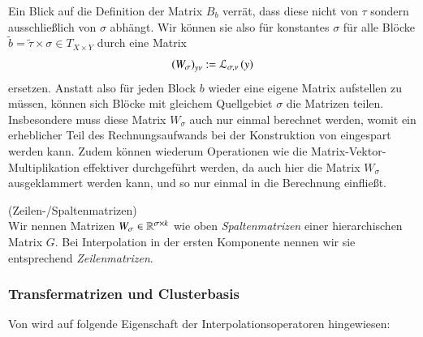     Ein Blick auf die Definition der Matrix $B_b$ verrät, dass diese nicht von $\tau$ sondern ausschließlich von $\sigma$ abhängt. Wir können sie also für konstantes $\sigma$ für alle Blöcke 
    $\tilde b = \tilde \tau \times \sigma \in T_{X \times Y}$ durch eine Matrix
    \begin{equation*}
      \left(W_\sigma\right)_{y\nu} := \mathcal{L}_{\sigma, \nu}\left(y\right)
    \end{equation*} 
    ersetzen. Anstatt also für jeden Block $b$ wieder eine eigene Matrix aufstellen zu müssen, können sich Blöcke mit gleichem Quellgebiet $\sigma$ die Matrizen teilen. Insbesondere muss diese 
    Matrix $W_\sigma$ auch nur einmal berechnet werden, womit ein erheblicher Teil des Rechnungsaufwands bei der Konstruktion von \hmat eingespart werden kann. Zudem können wiederum Operationen
    wie die Matrix-Vektor-Multiplikation effektiver durchgeführt werden, da auch hier die Matrix $W_\sigma$ ausgeklammert werden kann, und so nur einmal in die Berechnung einfließt. \citep{nichtlokop}
    
    \begin{defn}
      (Zeilen-/Spaltenmatrizen)\\
      Wir nennen Matrizen $W_\sigma \in \mathbb{R}^{\sigma \times k}$ wie oben \textit{Spaltenmatrizen} einer hierarchischen Matrix $G$. Bei Interpolation in der ersten Komponente nennen wir sie 
      entsprechend \textit{Zeilenmatrizen}.
    \end{defn}

    
    \subsubsection{Transfermatrizen und Clusterbasis}
    \label{sec:transmat}
    Von \citet{h2approxint} wird auf folgende Eigenschaft der Interpolationsoperatoren hingewiesen:
    
    

